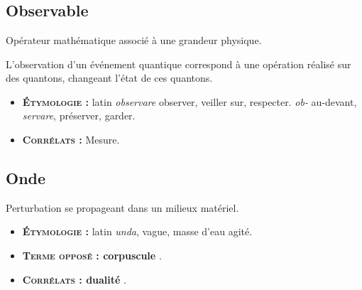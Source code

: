 \chapter{}
\section{Observable}
Opérateur mathématique associé à une grandeur physique.

L'observation d'un événement quantique correspond à une opération réalisé sur des quantons, changeant l'état de ces quantons.

{\footnotesize
\begin{itemize}[leftmargin=1cm, label=, itemsep=1pt]
\item {\bf \textsc{Étymologie} :} latin {\it observare} observer, veiller sur, respecter. {\it ob-} au-devant, {\it servare}, préserver, garder.
\item {\bf \textsc{Corrélats} :} Mesure.
\end{itemize}
}
\section{Onde}
Perturbation se propageant dans un milieux matériel.
{\footnotesize
\begin{itemize}[leftmargin=1cm, label=, itemsep=1pt]
\item {\bf \textsc{Étymologie} :} latin {\it unda}, vague, masse d'eau agité.
\item {\bf \textsc{Terme opposé :} corpuscule} .
\item {\bf \textsc{Corrélats :} dualité} .
\end{itemize}
}
